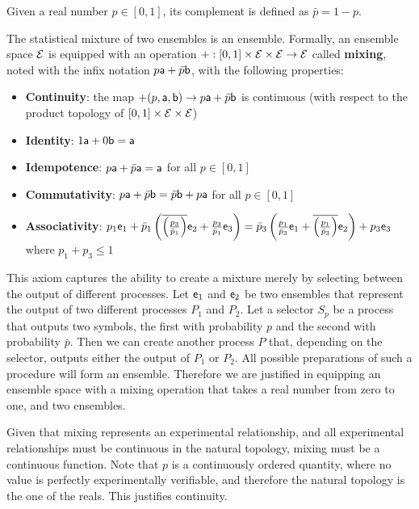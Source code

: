 \begin{mathSection}
\begin{defn}
	Given a real number $p \in [0,1]$, its complement is defined as $\bar{p} = 1-p$.
\end{defn}

\begin{axiom}
	The statistical mixture of two ensembles is an ensemble. Formally, an ensemble space $\Ens$ is equipped with an operation $+ : [0, 1] \times \Ens \times \Ens \to \Ens$ called \textbf{mixing}, noted with the infix notation $p \ens[a] + \bar{p} \ens[b]$, with the following properties:
	\begin{itemize}
		\item \textbf{Continuity}: the map $+(p, \ens[a], \ens[b])  \to p \ens[a] + \bar{p} \ens[b]$ is continuous (with respect to the product topology of $[0, 1] \times \Ens \times \Ens$)
		\item \textbf{Identity}: $1 \ens[a] + 0 \ens[b] = \ens[a]$
		\item \textbf{Idempotence}:  $p \ens[a] + \bar{p} \ens[a] = \ens[a]$ for all $p \in [0,1]$
		\item \textbf{Commutativity}: $p \ens[a] + \bar{p} \ens[b] = \bar{p} \ens[b] + p \ens[a]$ for all $p \in [0,1]$
		\item \textbf{Associativity}: $p_1 \ens_1 + \bar{p}_1\left(\overline{\left(\frac{p_3}{\bar{p}_1}\right)}\ens_2 + \frac{p_3}{\bar{p}_1}\ens_3\right) =  \bar{p}_3\left(\frac{p_1}{\bar{p}_3} \ens_1 +  \overline{\left(\frac{p_1}{\bar{p}_3}\right)}\ens_2\right) + p_3 \ens_3$ where $p_1 + p_3 \leq 1$
	\end{itemize}
\end{axiom}

\begin{justification}
	This axiom captures the ability to create a mixture merely by selecting between the output of different processes. Let $\ens_1$ and $\ens_2$ be two ensembles that represent the output of two different processes $P_1$ and $P_2$. Let a selector $S_p$ be a process that outputs two symbols, the first with probability $p$ and the second with probability $\bar{p}$. Then we can create another process $P$ that, depending on the selector, outputs either the output of $P_1$ or $P_2$. All possible preparations of such a procedure will form an ensemble. Therefore we are justified in equipping an ensemble space with a mixing operation that takes a real number from zero to one, and two ensembles.
	
	Given that mixing represents an experimental relationship, and all experimental relationships must be continuous in the natural topology, mixing must be a continuous function. Note that $p$ is a continuously ordered quantity, where no value is perfectly experimentally verifiable, and therefore the natural topology is the one of the reals. This justifies continuity.


\end{justification}
\end{mathSection}
